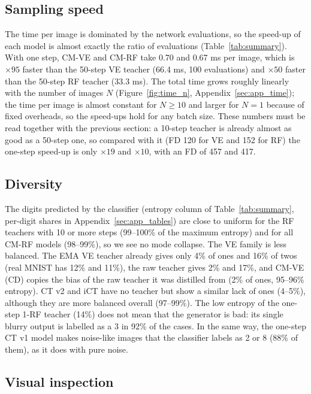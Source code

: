 \documentclass{article}
\begin{document}
\subsection{Sampling speed}

The time per image is dominated by the network evaluations, so the speed-up of
each model is almost exactly the ratio of evaluations (Table~\ref{tab:summary}).
With one step, CM-VE and CM-RF take 0.70 and 0.67 ms per image, which is
$\times 95$ faster than the 50-step VE teacher (66.4 ms, 100 evaluations) and
$\times 50$ faster than the 50-step RF teacher (33.3 ms). The total time grows
roughly linearly with the number of images $N$ (Figure~\ref{fig:time_n},
Appendix~\ref{sec:app_time}); the time per image is almost constant for
$N \geq 10$ and larger for $N = 1$ because of fixed overheads, so the speed-ups
hold for any batch size. These numbers must be read together with the previous
section: a 10-step teacher is already almost as good as a 50-step one, so
compared with it (FD 120 for VE and 152 for RF) the one-step speed-up is only
$\times 19$ and $\times 10$, with an FD of 457 and 417.

\subsection{Diversity}

The digits predicted by the classifier (entropy column of
Table~\ref{tab:summary}, per-digit shares in Appendix~\ref{sec:app_tables}) are
close to uniform for the RF teachers with 10 or more steps (99--100\% of the
maximum entropy) and for all CM-RF models (98--99\%), so we see no mode
collapse. The VE family is less balanced. The EMA VE teacher already gives only
4\% of ones and 16\% of twos (real MNIST has 12\% and 11\%), the raw teacher
gives 2\% and 17\%, and CM-VE (CD) copies the bias of the raw teacher it was
distilled from (2\% of ones, 95--96\% entropy). CT v2 and iCT have no teacher but
show a similar lack of ones (4--5\%), although they are more balanced overall
(97--99\%). The low entropy of the one-step 1-RF teacher (14\%) does not mean
that the generator is bad: its single blurry output is labelled as a 3 in 92\%
of the cases. In the same way, the one-step CT v1 model makes noise-like images that
the classifier labels as 2 or 8 (88\% of them), as it does with pure noise.

\subsection{Visual inspection}
\end{document}
